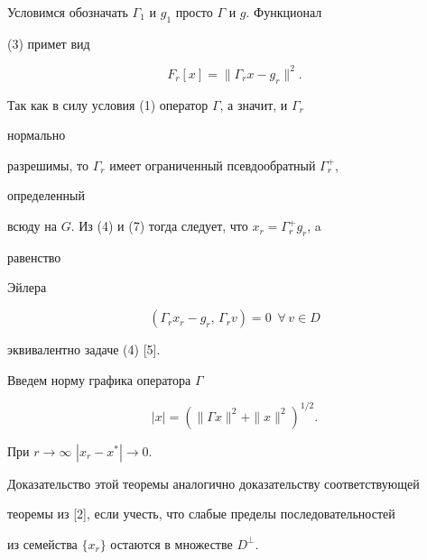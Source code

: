 Условимся обозначать $\Gamma_1$ и $g_1$ просто $\Gamma$ и $g$. Функционал 


(3) примет вид 


\begin{equation} 


F_r[x]=\|\Gamma_r x-g_r\|^2. 


\end{equation} 


Так как в силу условия (1) оператор $\Gamma$, а значит, и $\Gamma_r$ 


нормально  


разрешимы, то $\Gamma_r$ имеет ограниченный псевдообратный $\Gamma^+_r$, 


определенный  


всюду на $G$. Из (4) и (7) тогда следует, что $x_r=\Gamma^+_r g_r$, a 


равенство  


Эйлера 


\begin{equation} 


(\Gamma_r x_r-g_r,\,\Gamma_r v)=0\ \; \forall\,v\in D 


\end{equation} 


эквивалентно задаче (4) [5]. 


 


Введем норму графика оператора $\Gamma$ 


\begin{equation} 


|x|=(\|\Gamma x\|^2+\|x\|^2)^{1/2}. 


\end{equation} 


 


\begin{thm} 


При $r\to\infty$\; $|x_r-x^*|\to0$. 


\end{thm} 


 


Доказательство этой теоремы аналогично доказательству соответствующей  


теоремы из [2], если учесть, что слабые пределы последовательностей  


из семейства $\{x_r\}$ остаются в множестве $D^\bot$.  


